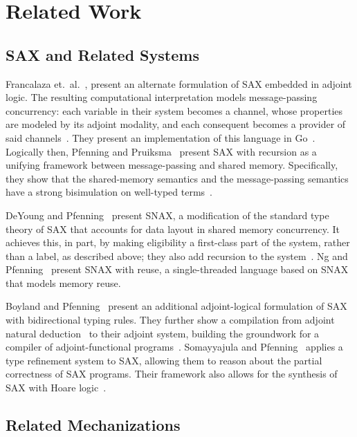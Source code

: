 \section{Related Work}
\label{section:related}

\subsection{SAX and Related Systems}

Francalaza et.\ al.~\cite{FrancalanzaTP24}, present an alternate formulation of
SAX embedded in adjoint logic. The resulting computational interpretation models
message-passing concurrency: each variable in their system becomes a channel,
whose properties are modeled by its adjoint modality, and each consequent
becomes a provider of said channels~\cite{FrancalanzaTP24}. They present an
implementation of this language in Go~\cite{FrancalanzaTP24}. Logically then,
Pfenning and Pruiksma~\cite{10.1007/978-3-031-35361-1_1} present SAX with
recursion as a unifying framework between message-passing and shared
memory. Specifically, they show that the shared-memory semantics and the
message-passing semantics have a strong bisimulation on well-typed
terms~\cite{10.1007/978-3-031-35361-1_1}.


DeYoung and Pfenning~\cite{DeYoungP23} present SNAX, a modification of the
standard type theory of SAX that accounts for data layout in shared memory
concurrency. It achieves this, in part, by making eligibility a first-class part
of the system, rather than a label, as described above; they also add recursion
to the system~\cite{DeYoungP23}. Ng and Pfenning~\cite{Ng2024MemoryReuse}
present SNAX with reuse, a single-threaded language based on SNAX that models
memory reuse.


Boyland and Pfenning~\cite{BoylandPfenning2025SAX} present an additional
adjoint-logical formulation of SAX with bidirectional typing rules. They further
show a compilation from adjoint natural deduction~\cite{jang2024adjoint} to
their adjoint system, building the groundwork for a compiler of
adjoint-functional programs~\cite{BoylandPfenning2025SAX}. Somayyajula and
Pfenning~\cite{Somayyajula_2023} applies a type refinement system to SAX,
allowing them to reason about the partial correctness of SAX programs. Their
framework also allows for the synthesis of SAX with Hoare
logic~\cite{Somayyajula_2023}.


\subsection{Related Mechanizations}


